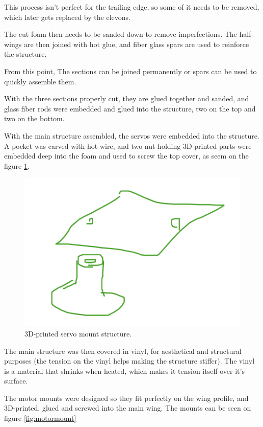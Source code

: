 This process isn't perfect for the trailing edge, so some of it needs to be removed, which later gets replaced by the elevons.

The cut foam then needs to be sanded down to remove imperfections.
The half-wings are then joined with hot glue, and fiber glass spars are used to reinforce the structure.


From this point, The sections can be joined permanently or spars can be used to quickly assemble them.


With the three sections properly cut, they are glued together and sanded, and glass fiber rods were embedded and glued into the structure, two on the top and two on the bottom.

With the main structure assembled, the servos were embedded into the structure. A pocket was carved with hot wire, and two nut-holding 3D-printed parts were embedded deep into the foam and used to screw the top cover, as seem on the figure \ref{fig:servomount}.


\begin{figure}[H]
\centering
  \includegraphics[width=\linewidth]{figs/servo_mount.png}
  \caption{3D-printed servo mount structure.}
  \label{fig:servomount}
\end{figure}


The main structure was then covered in vinyl, for aesthetical and structural purposes (the tension on the vinyl helps making the structure stiffer). The vinyl is a material that shrinks when heated, which makes it tension itself over it's surface.

The motor mounts were designed so they fit perfectly on the wing profile, and 3D-printed, glued and screwed into the main wing.
The mounts can be seen on figure \ref{fig:motormount}



